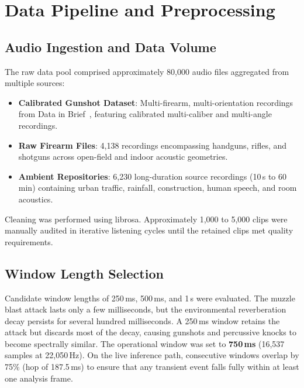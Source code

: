 \documentclass[conference]{IEEEtran}
\begin{document}
\section{Data Pipeline and Preprocessing}
\label{sec:data}

\subsection{Audio Ingestion and Data Volume}
The raw data pool comprised approximately 80{,}000 audio files aggregated from multiple sources:
\begin{itemize}
    \item \textbf{Calibrated Gunshot Dataset}: Multi-firearm, multi-orientation recordings from Data in Brief~\cite{dib2023}, featuring calibrated multi-caliber and multi-angle recordings.
    \item \textbf{Raw Firearm Files}: 4{,}138 recordings encompassing handguns, rifles, and shotguns across open-field and indoor acoustic geometries.
    \item \textbf{Ambient Repositories}: 6{,}230 long-duration source recordings (10\,s to 60\,min) containing urban traffic, rainfall, construction, human speech, and room acoustics.
\end{itemize}
Cleaning was performed using librosa. Approximately 1{,}000 to 5{,}000 clips were manually audited in iterative listening cycles until the retained clips met quality requirements.

\subsection{Window Length Selection}
Candidate window lengths of 250\,ms, 500\,ms, and 1\,s were evaluated. The muzzle blast attack lasts only a few milliseconds, but the environmental reverberation decay persists for several hundred milliseconds. A 250\,ms window retains the attack but discards most of the decay, causing gunshots and percussive knocks to become spectrally similar. The operational window was set to \textbf{750\,ms} (16{,}537 samples at 22{,}050\,Hz). On the live inference path, consecutive windows overlap by 75\% (hop of 187.5\,ms) to ensure that any transient event falls fully within at least one analysis frame.
\end{document}
